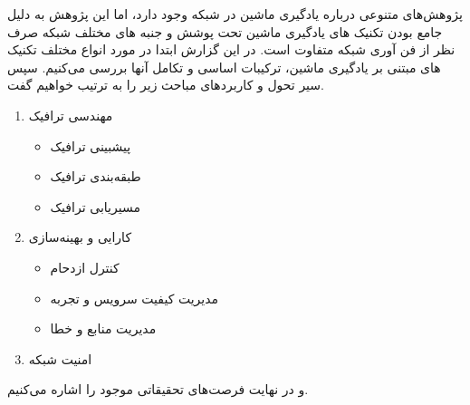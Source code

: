 پژوهش‌های متنوعی درباره یادگیری ماشین در شبکه وجود دارد، اما این پژوهش به دلیل جامع بودن تکنیک های یادگیری ماشین تحت پوشش و جنبه های مختلف شبکه صرف نظر از فن آوری شبکه متفاوت است. در این گزارش ابتدا در مورد انواع مختلف تکنیک های مبتنی بر یادگیری ماشین، ترکیبات اساسی و تکامل آنها بررسی می‌کنیم. سپس سیر تحول و کاربردهای مباحث زیر را به ترتیب خواهیم گفت.
\begin{enumerate}
    \item مهندسی ترافیک
    \begin{itemize}
        \item پیشبینی ترافیک
        \item طبقه‌بندی ترافیک
        \item مسیریابی ترافیک
    \end{itemize}
    
    
    \item کارایی و بهینه‌سازی
    \begin{itemize}
        \item کنترل ازدحام
        \item مدیریت کیفیت سرویس و تجربه
        \item مدیریت منابع و خطا
    \end{itemize}
    \item امنیت شبکه
    
\end{enumerate}
و در نهایت فرصت‌های تحقیقاتی موجود را اشاره می‌کنیم.
